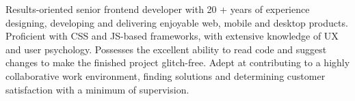 

\begin{cvparagraph}

    Results-oriented senior frontend developer with 20 + years of experience
    designing, developing and delivering enjoyable web, mobile and desktop products.
    Proficient with CSS and JS-based frameworks, with extensive knowledge of UX
    and user psychology. Possesses the excellent ability to read code and suggest
    changes to make the finished project glitch-free. Adept at contributing to a
    highly collaborative work environment, finding solutions and determining
    customer satisfaction with a minimum of supervision.
     
\end{cvparagraph}
